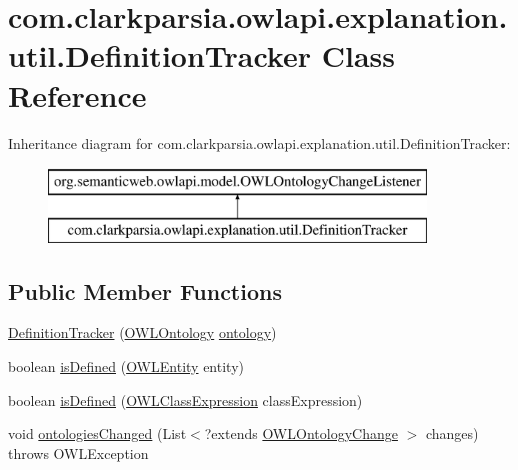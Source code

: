 \hypertarget{classcom_1_1clarkparsia_1_1owlapi_1_1explanation_1_1util_1_1_definition_tracker}{\section{com.\-clarkparsia.\-owlapi.\-explanation.\-util.\-Definition\-Tracker Class Reference}
\label{classcom_1_1clarkparsia_1_1owlapi_1_1explanation_1_1util_1_1_definition_tracker}
}
Inheritance diagram for com.\-clarkparsia.\-owlapi.\-explanation.\-util.\-Definition\-Tracker\-:\begin{figure}[H]
\begin{center}
\leavevmode
\includegraphics[height=2.000000cm]{classcom_1_1clarkparsia_1_1owlapi_1_1explanation_1_1util_1_1_definition_tracker}
\end{center}
\end{figure}
\subsection*{Public Member Functions}
\begin{DoxyCompactItemize}
\item 
\hyperlink{classcom_1_1clarkparsia_1_1owlapi_1_1explanation_1_1util_1_1_definition_tracker_ac939930e74fbb9db23d627e7b427109d}{Definition\-Tracker} (\hyperlink{interfaceorg_1_1semanticweb_1_1owlapi_1_1model_1_1_o_w_l_ontology}{O\-W\-L\-Ontology} \hyperlink{classcom_1_1clarkparsia_1_1owlapi_1_1explanation_1_1util_1_1_definition_tracker_a8ef0afa6dbb2c5bdb3ed4dda7bda35e5}{ontology})
\item 
boolean \hyperlink{classcom_1_1clarkparsia_1_1owlapi_1_1explanation_1_1util_1_1_definition_tracker_a806929f81d98d107c6fbabe37abe3326}{is\-Defined} (\hyperlink{interfaceorg_1_1semanticweb_1_1owlapi_1_1model_1_1_o_w_l_entity}{O\-W\-L\-Entity} entity)
\item 
boolean \hyperlink{classcom_1_1clarkparsia_1_1owlapi_1_1explanation_1_1util_1_1_definition_tracker_a15b280ed9ad14d32f67631cb74e01d63}{is\-Defined} (\hyperlink{interfaceorg_1_1semanticweb_1_1owlapi_1_1model_1_1_o_w_l_class_expression}{O\-W\-L\-Class\-Expression} class\-Expression)
\item 
void \hyperlink{classcom_1_1clarkparsia_1_1owlapi_1_1explanation_1_1util_1_1_definition_tracker_abd665bc396d50007615225498a3ba2e5}{ontologies\-Changed} (List$<$?extends \hyperlink{classorg_1_1semanticweb_1_1owlapi_1_1model_1_1_o_w_l_ontology_change}{O\-W\-L\-Ontology\-Change} $>$ changes)  throws O\-W\-L\-Exception 
\end{DoxyCompactItemize}
